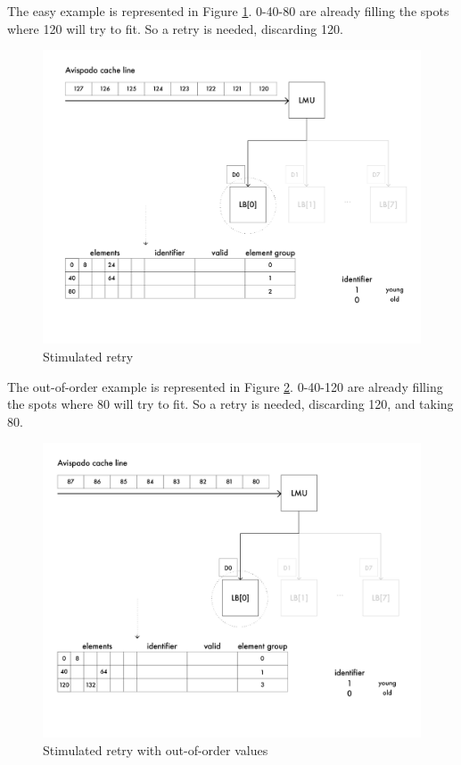 The easy example is represented in Figure \ref{cache-to-lb-ret-ex}. 0-40-80 are already filling the spots where 120 will try to fit. So a retry is needed, discarding 120.

\begin{figure}[H]
    \centering
    \includegraphics[scale = 0.5]{Chapter_2/img/cache-to-lb-ret-ex.png}
    \caption{Stimulated retry}
    \label{cache-to-lb-ret-ex}
\end{figure}


The out-of-order example is represented in Figure \ref{cache-to-lb-ooo-ret-ex}. 0-40-120 are already filling the spots where 80 will try to fit. So a retry is needed, discarding 120, and taking 80.

\begin{figure}[H]
    \centering
    \includegraphics[scale = 0.5]{Chapter_2/img/cache-to-lb-ooo-ret-ex.png}
    \caption{Stimulated retry with out-of-order values}
    \label{cache-to-lb-ooo-ret-ex}
\end{figure}




